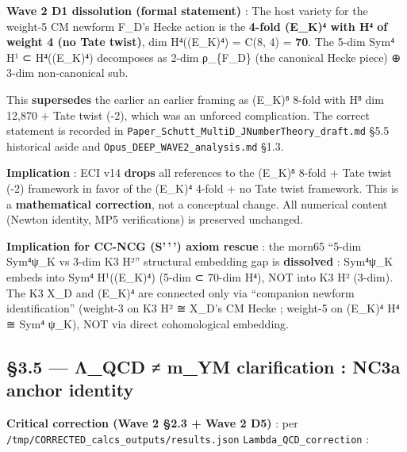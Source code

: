 \documentclass[
  11pt,
  a4paper,
]{article}
\begin{document}
\textbf{Wave 2 D1 dissolution (formal statement)} : The host variety for the weight-5 CM newform F\_D's Hecke action is the \textbf{4-fold (E\_K)⁴ with H⁴ of weight 4 (no Tate twist)}, dim H⁴((E\_K)⁴) = C(8, 4) = \textbf{70}. The 5-dim Sym⁴ H¹ ⊂ H⁴((E\_K)⁴) decomposes as 2-dim ρ\_\{F\_D\} (the canonical Hecke piece) ⊕ 3-dim non-canonical sub.

This \textbf{supersedes} the earlier an earlier framing as (E\_K)⁸ 8-fold with H⁸ dim 12,870 + Tate twist (-2), which was an unforced complication. The correct statement is recorded in \texttt{Paper\_Schutt\_MultiD\_JNumberTheory\_draft.md} §5.5 historical aside and \texttt{Opus\_DEEP\_WAVE2\_analysis.md} §1.3.

\textbf{Implication} : ECI v14 \textbf{drops} all references to the (E\_K)⁸ 8-fold + Tate twist (-2) framework in favor of the (E\_K)⁴ 4-fold + no Tate twist framework. This is a \textbf{mathematical correction}, not a conceptual change. All numerical content (Newton identity, MP5 verifications) is preserved unchanged.

\textbf{Implication for CC-NCG (S'\,'\,') axiom rescue} : the morn65 ``5-dim Sym⁴ψ\_K vs 3-dim K3 H²'' structural embedding gap is \textbf{dissolved} : Sym⁴ψ\_K embeds into Sym⁴ H¹((E\_K)⁴) (5-dim ⊂ 70-dim H⁴), NOT into K3 H² (3-dim). The K3 X\_D and (E\_K)⁴ are connected only via ``companion newform identification'' (weight-3 on K3 H² ≅ X\_D's CM Hecke ; weight-5 on (E\_K)⁴ H⁴ ≅ Sym⁴ ψ\_K), NOT via direct cohomological embedding.

\hypertarget{ux3bb_qcd-m_ym-clarification-nc3a-anchor-identity}{%
\subsection{§3.5 --- Λ\_QCD ≠ m\_YM clarification : NC3a anchor identity}\label{ux3bb_qcd-m_ym-clarification-nc3a-anchor-identity}}

\textbf{Critical correction (Wave 2 §2.3 + Wave 2 D5)} : per \texttt{/tmp/CORRECTED\_calcs\_outputs/results.json} \texttt{Lambda\_QCD\_correction} :
\end{document}
